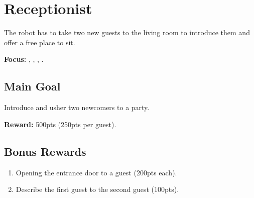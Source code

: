 \section{Receptionist}
\label{test:receptionist}
The robot has to take two new guests to the living room to introduce them and offer a free place to sit.

\noindent \textbf{Focus:} \SysI{}, \HRI{}, \PerDet{}, \PerRec.

\subsection*{Main Goal}
Introduce and usher two newcomers to a party.

\noindent\textbf{Reward:} 500pts (250pts per guest).

\subsection*{Bonus Rewards}
\begin{enumerate}[nosep]
	\item Opening the entrance door to a guest (200pts each).
	\item Describe the first guest to the second guest  (100pts).
\end{enumerate}


